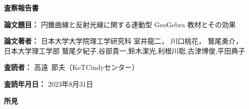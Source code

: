 \documentclass[11pt]{jarticle}
\begin{document}
\begin{center}
{\Large\bf 査察報告書}
\end{center}

\vspace{5mm}
\noindent
{\bf 論文題目：}\hspace{2zw}%
円錐曲線と反射光線に関する連動型 GeoGebra 教材とその効果

\noindent
{\bf 論文著者：}\hspace{2zw}%
日本大学大学院理工学研究科 室井龍二， 川口桃花， 鷲尾勇介，\\
 日本大学理工学部 鷲尾夕紀子,谷部貴一,鈴木潔光,利根川聡,古津博俊,平田典子

\noindent
{\bf 査読者：}\hspace{3zw}%
高遠\ 節夫（KeTCindyセンター）

\noindent
{\bf 査読年月日：}\hspace{1zw}%
2023年8月31日

\vspace*{10mm}
\begin{center}
{\large\bf 所\hspace{2zw}見}
\end{center}
\end{document}
